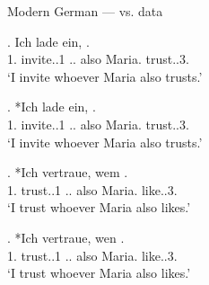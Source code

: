 \documentclass[xcolor=dvipsnames,10pt]{beamer}
\begin{document}
\begin{frame}{Modern German ---  vs.  data}

\exg. Ich {lade ein},    . \\
1. invite..1\scsub{[acc]} .. also Maria. trust..3\scsub{[dat]}.\\
`I invite whoever Maria also trusts.' \label{ex:mg-acc-dat}

\pause

\exg. *Ich {lade ein},    . \\
1. invite..1\scsub{[acc]} .. also Maria. trust..3\scsub{[dat]}.\\
`I invite whoever Maria also trusts.' \label{ex:mg-acc-dat-u}

\pause

\exg. *Ich vertraue, wem   . \\
1. trust..1\scsub{[dat]} .. also Maria. like..3\scsub{[acc]}.\\
`I trust whoever Maria also likes.' \label{ex:mg-dat-acc}

\pause

\exg. *Ich vertraue, wen   . \\
1. trust..1\scsub{[dat]} .. also Maria. like..3\scsub{[acc]}.\\
`I trust whoever Maria also likes.' \label{ex:mg-dat-acc-u}

\end{frame}
\end{document}
